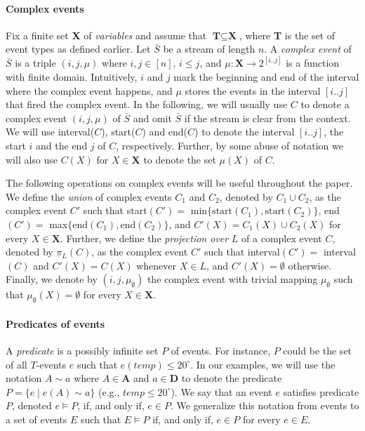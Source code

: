 \paragraph{Complex events} Fix a finite set \textbf{X} of \textit{variables} and assume that $\textbf{T} \subseteq \textbf{X}$, where \textbf{T} is the set of event types as defined earlier. Let $\bar{S}$ be a stream of length $n$.
A \textit{complex event} of $\bar{S}$ is a triple $(i, j, \mu)$ where $i,j\in[n]$, $i\leq j$, and $\mu: \textbf{X} \rightarrow 2^{[i..j]}$ is a function with finite domain.
Intuitively, $i$ and $j$ mark the beginning and end of the interval where the complex event happens, and $\mu$ stores the events in the interval $[i..j]$ that fired the complex event.
In the following, we will usually use $C$ to denote a complex event $(i,j,\mu)$ of $\bar{S}$ and omit $\bar{S}$ if the stream is clear from the context.
We will use interval($C$), start($C$) and end($C$) to denote the interval $[i..j]$, the start $i$ and the end $j$ of $C$, respectively. 
Further, by some abuse of notation we will also use $C(X)$ for $X\in\textbf{X}$ to denote the set $\mu(X)$ of $C$.

The following operations on complex events will be useful throughout the paper. We define the \textit{union} of complex events $C_1$ and $C_2$, denoted by $C_1\cup C_2$, as the complex event $C'$ such that start$(C')=$ min$\{\text{start}(C_1), \text{start}(C_2)\}$, end$(C')=$ max$\{\text{end}(C_1), \text{end}(C_2)\}$, and $C'(X)=C_1(X)\cup C_2(X)$ for every $X\in\textbf{X}$.
Further, we define the \textit{projection over} $L$ of a complex event $C$, denoted by $\pi_L(C)$, as the complex event $C'$ such that interval$(C')=$ interval$(C)$ and $C'(X)=C(X)$ whenever $X\in L$, and $C'(X)=\emptyset$ otherwise. 
Finally, we denote by $(i,j,\mu_\emptyset)$ the complex event with trivial mapping $\mu_\emptyset$ such that $\mu_\emptyset(X)=\emptyset$ for every $X\in\textbf{X}$.

\paragraph{Predicates of events} A \textit{predicate} is a possibly infinite set $P$ of events. 
For instance, $P$ could be the set of all $T$-events $e$ such that $e(temp) \leq 20^\circ$.
In our examples, we will use the notation $A \sim a$ where $A\in\textbf{A}$ and $a\in\textbf{D}$ to denote the predicate $P = \{e \mid e(A)\sim a\}$ (e.g., $temp \leq 20^\circ$). 
We say that an event $e$ satisfies predicate $P$, denoted $e\vDash P$, if, and only if, $e\in P$. 
We generalize this notation from events to a set of events $E$ such that $E\vDash P$ if, and only if, $e\in P$ for every $e\in E$.

